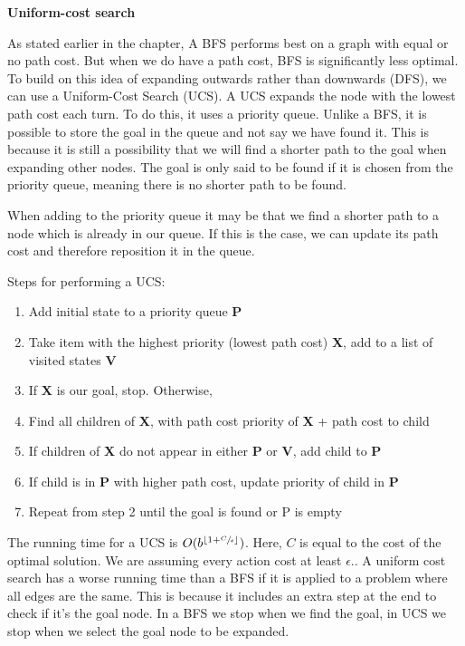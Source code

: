 \documentclass[]{final_report}
\begin{document}
\textbf{Uniform-cost search}

As stated earlier in the chapter, A BFS performs best on a graph with equal or no path cost. But when we do have a path cost, BFS is significantly less optimal. To build on this idea of expanding outwards rather than downwards (DFS), we can use a Uniform-Cost Search (UCS). A UCS expands the node with the lowest path cost each turn. To do this, it uses a priority queue. Unlike a BFS, it is possible to store the goal in the queue and not say we have found it. This is because it is still a possibility that we will find a shorter path to the goal when expanding other nodes. The goal is only said to be found if it is chosen from the priority queue, meaning there is no shorter path to be found. 

When adding to the priority queue it may be that we find a shorter path to a node which is already in our queue. If this is the case, we can update its path cost and therefore reposition it in the queue.

Steps for performing a UCS:
\begin{enumerate}
    \item Add initial state to a priority queue \textbf{P}
    \item Take item with the highest priority (lowest path cost) \textbf{X}, add to a list of visited states \textbf{V}
    \item If \textbf{X} is our goal, stop. Otherwise,
    \item Find all children of \textbf{X}, with path cost priority of \textbf{X} + path cost to child
    \item If children of \textbf{X} do not appear in either \textbf{P} or \textbf{V}, add child to \textbf{P}
    \item If child is in \textbf{P} with higher path cost, update priority of child in \textbf{P}
    \item Repeat from step 2 until the goal is found or P is empty
    \end{enumerate}
    
The running time for a UCS is $O(b^{\lfloor 1+\sfrac{C}{\epsilon} \rfloor})$. Here, $C$ is equal to the cost of the optimal solution. We are assuming every action cost at least $\epsilon$.\cite{pathak2018comparative}. A uniform cost search has a worse running time than a BFS if it is applied to a problem where all edges are the same. This is because it includes an extra step at the end to check if it's the goal node. In a BFS we stop when we find the goal, in UCS we stop when we select the goal node to be expanded.\cite{time-complexity}
\end{document}
